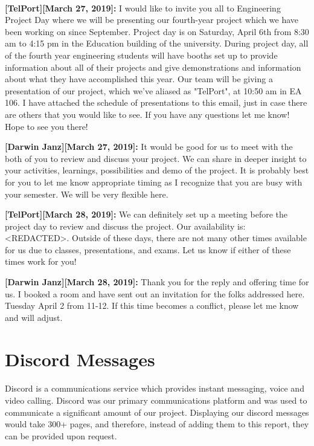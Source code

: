 \documentclass[12pt]{article}
\begin{document}
\paragraph{}
\textbf{[TelPort][March 27, 2019]:} I would like to invite you all to Engineering Project Day where we will be presenting our fourth-year project which we have been working on since September. Project day is on Saturday, April 6th from 8:30 am to 4:15 pm in the Education building of the university. During project day, all of the fourth year engineering students will have booths set up to provide information about all of their projects and give demonstrations and information about what they have accomplished this year. Our team will be giving a presentation of our project, which we've aliased as "TelPort", at 10:50 am in EA 106. I have attached the schedule of presentations to this email, just in case there are others that you would like to see. If you have any questions let me know! Hope to see you there!

\textbf{[Darwin Janz][March 27, 2019]:} It would be good for us to meet with the both of you to review and discuss your project.  We can share in deeper insight to your activities, learnings, possibilities and demo of the project.  It is probably best for you to let me know appropriate timing as I recognize that you are busy with your semester.  We will be very flexible here.

\textbf{[TelPort][March 28, 2019]:} We can definitely set up a meeting before the project day to review and discuss the project. Our availability is: <REDACTED>. Outside of these days, there are not many other times available for us due to classes, presentations, and exams. Let us know if either of these times work for you!

\textbf{[Darwin Janz][March 28, 2019]:} Thank you for the reply and offering time for us.  I booked a room and have sent out an invitation for the folks addressed here. Tuesday April 2 from 11-12.  If this time becomes a conflict, please let me know and will adjust.


\section{Discord Messages}

\paragraph{}
Discord is a communications service which provides instant messaging, voice and video calling. Discord was our primary communications platform and was used to communicate a significant amount of our project. Displaying our discord messages would take 300+ pages, and therefore, instead of adding them to this report, they can be provided upon request.
\end{document}

